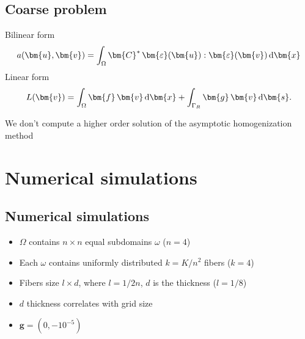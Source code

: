\documentclass[compress,pdf,mathserif]{beamer}
\begin{document}
\subsection{Coarse problem}
\begin{frame}
    \centering
    Bilinear form
    \[
a(\bm{u}, \bm{v}) = \int_\Omega \bm{C}^* \, \bm{\varepsilon}(\bm{u}) : \bm{\varepsilon}(\bm{v})\, {\rm d}\bm{x}\]
Linear form
\[
L(\bm{v}) = \int_\Omega \bm{f}\, \bm{v} \, {\rm d}\bm{x} + \int_{\Gamma_R} \bm{g}\, \bm{v}\, {\rm d}\bm{s}.
\]

We don't compute a higher order solution of the asymptotic homogenization method
\end{frame}

\section{Numerical simulations}
\subsection{Numerical simulations}
\begin{frame}
    \centering
    \vspace{1em}

    \begin{itemize}
        \item $\Omega$ contains $n \times n$ equal subdomains $\omega$ ($n = 4$)
        \item Each $\omega$ contains uniformly distributed $k=K/n^2$ fibers ($k=4$)
        \item Fibers size $l \times d$, where $l=1/2n$, $d$ is the thickness ($l=1/8$)
        \item $d$ thickness correlates with grid size
        \item $\bm{g}=(0,-10^{-5})$
    \end{itemize}
\end{frame}
\end{document}
